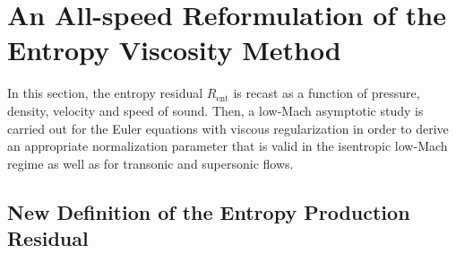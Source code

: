 \documentclass[preprint,10pt]{elsarticle}
\newcommand{\resi}{R_\text{ent}}
\begin{document}
\section{An All-speed Reformulation of the Entropy Viscosity Method} \label{sec:extension}

In this section, the entropy residual $\resi$ is recast as a function of pressure, density, velocity and speed 
of sound. Then, a low-Mach asymptotic study is carried out for the Euler equations with viscous regularization 
in order to derive an appropriate normalization parameter that is valid in the isentropic low-Mach regime as well as for 
transonic and supersonic flows. 

\subsection{New Definition of the Entropy Production Residual}\label{sec:new_ent_prod} 
\end{document}
